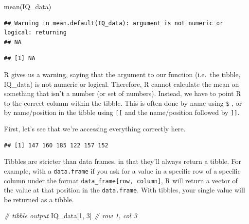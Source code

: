 \documentclass[
]{book}
\newenvironment{Shaded}{\begin{snugshade}}{\end{snugshade}}
\newcommand{\CommentTok}[1]{\textcolor[rgb]{0.56,0.35,0.01}{\textit{#1}}}
\newcommand{\DecValTok}[1]{\textcolor[rgb]{0.00,0.00,0.81}{#1}}
\newcommand{\FunctionTok}[1]{\textcolor[rgb]{0.00,0.00,0.00}{#1}}
\newcommand{\NormalTok}[1]{#1}
\newcommand{\SpecialCharTok}[1]{\textcolor[rgb]{0.00,0.00,0.00}{#1}}
\newcommand{\StringTok}[1]{\textcolor[rgb]{0.31,0.60,0.02}{#1}}
\begin{document}
\begin{Shaded}
\begin{Highlighting}[]
\FunctionTok{mean}\NormalTok{(IQ\_data)}
\end{Highlighting}
\end{Shaded}

\begin{verbatim}
## Warning in mean.default(IQ_data): argument is not numeric or logical: returning
## NA
\end{verbatim}

\begin{verbatim}
## [1] NA
\end{verbatim}

R gives us a warning, saying that the argument to our function (i.e.~the tibble, IQ\_data) is not numeric or logical. Therefore, R cannot calculate the mean on something that isn't a number (or set of numbers). Instead, we have to point R to the correct column within the tibble. This is often done by name using \texttt{\$} , or by name/position in the tibble using \texttt{{[}{[}} and the name/position followed by \texttt{{]}{]}}.

First, let's see that we're accessing everything correctly here.

\begin{Shaded}
\end{Shaded}

\begin{verbatim}
## [1] 147 160 185 122 157 152
\end{verbatim}

Tibbles are stricter than data frames, in that they'll always return a tibble. For example, with a \texttt{data.frame} if you ask for a value in a specific row of a specific column under the format \texttt{data\_frame{[}row,\ column{]}}, R will return a vector of the value at that position in the \texttt{data.frame}. With tibbles, your single value will be returned as a tibble.

\begin{Shaded}
\begin{Highlighting}[]
\CommentTok{\# tibble output}
\NormalTok{IQ\_data[}\DecValTok{1}\NormalTok{, }\DecValTok{3}\NormalTok{] }\CommentTok{\# row 1, col 3}
\end{Highlighting}
\end{Shaded}
\end{document}

